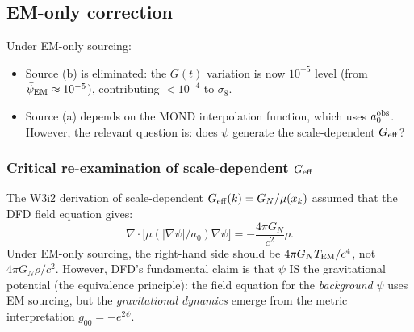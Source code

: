 \documentclass[11pt]{article}
\newcommand{\psiEM}{\bar{\psi}_{\rm EM}}
\newcommand{\GN}{G_N}
\newcommand{\Geff}{G_{\rm eff}}
\newcommand{\mufd}{\mu}
\begin{document}
\subsection{EM-only correction}

Under EM-only sourcing:
\begin{itemize}[nosep]
  \item Source (b) is eliminated: the $G(t)$ variation is now $10^{-5}$
    level (from $\psiEM \approx 10^{-5}$), contributing $< 10^{-4}$
    to $\sigma_8$.
  \item Source (a) depends on the MOND interpolation function, which uses
    $a_0^{\rm obs}$. However, the relevant question is: does $\psi$
    generate the scale-dependent $\Geff$?
\end{itemize}

\subsubsection{Critical re-examination of scale-dependent $\Geff$}

The W3i2 derivation of scale-dependent $\Geff(k) = \GN/\mufd(x_k)$ assumed
that the DFD field equation gives:
\begin{equation}
  \nabla\cdot\bigl[\mufd(|\nabla\psi|/a_0)\nabla\psi\bigr]
  = -\frac{4\pi \GN}{c^2}\rho.
\end{equation}
Under EM-only sourcing, the right-hand side should be
$4\pi \GN T_{\rm EM}/c^4$, not $4\pi \GN\rho/c^2$. However, DFD's
fundamental claim is that $\psi$ IS the gravitational potential (the
equivalence principle): the field equation for the \emph{background}
$\psi$ uses EM sourcing, but the \emph{gravitational dynamics} emerge
from the metric interpretation $g_{00} = -e^{2\psi}$.
\end{document}
